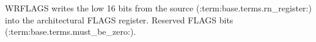 WRFLAGS writes the low 16 bits from the source (:term:base.terms.rn_register:) into the architectural FLAGS register. Reserved FLAGS bits (:term:base.terms.must_be_zero:).
